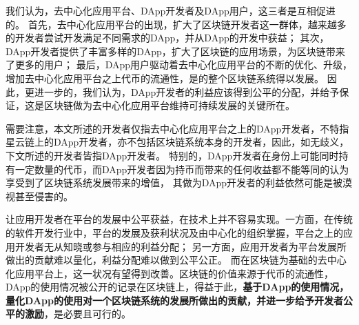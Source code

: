 我们认为，去中心化应用平台、DApp开发者及DApp用户，这三者是互相促进的。
首先，去中心化应用平台的出现，扩大了区块链开发者这一群体，越来越多的开发者尝试开发满足不同需求的DApp，并从DApp的开发中获益；
其次，DApp开发者提供了丰富多样的DApp，扩大了区块链的应用场景，为区块链带来了更多的用户；
最后，DApp用户驱动着去中心化应用平台的不断的优化、升级，增加去中心化应用平台之上代币的流通性，是的整个区块链系统得以发展。
因此，更进一步的，我们认为，DApp开发者的利益应该得到公平的分配，并给予保证，这是区块链做为去中心化应用平台维持可持续发展的关键所在。

需要注意，本文所述的开发者仅指去中心化应用平台之上的DApp开发者，不特指星云链上的DApp开发者，亦不包括区块链系统本身的开发者，因此，如无歧义，下文所述的开发者皆指DApp开发者。
特别的，DApp开发者在身份上可能同时持有一定数量的代币，而DApp开发者因为持币而带来的任何收益都不能等同的认为享受到了区块链系统发展带来的增值，
其做为DApp开发者的利益依然可能是被漠视甚至侵害的。


让应用开发者在平台的发展中公平获益，在技术上并不容易实现。一方面，在传统的软件开发行业中，平台的发展及获利状况及由中心化的组织掌握，平台之上的应用开发者无从知晓或参与相应的利益分配；
另一方面，应用开发者为平台发展所做出的贡献难以量化，利益分配难以做到公平公正。
而在区块链为基础的去中心化应用平台上，这一状况有望得到改善。区块链的价值来源于代币的流通性，DApp的使用情况被公开的记录在区块链上，得益于此，\textbf{基于DApp的使用情况，
量化DApp的使用对一个区块链系统的发展所做出的贡献，并进一步给予开发者公平的激励}，是必要且可行的。

